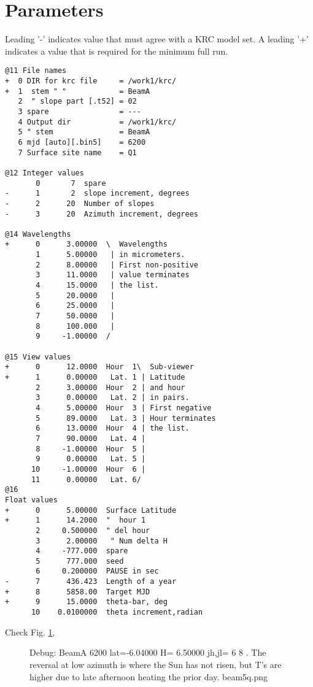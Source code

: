\documentclass{article}
\begin{document}
\section{Parameters}
Leading '-' indicates value that must agree with a KRC model set. A leading '+' indicates a value that is required for the minimum full run.
\vspace{-3.mm} 
\begin{verbatim}
@11 File names
+  0 DIR for krc file     = /work1/krc/
+  1  stem " "            = BeamA
   2  " slope part [.t52] = 02
   3 spare                = ---
   4 Output dir           = /work1/krc/
   5 " stem               = BeamA
   6 mjd [auto][.bin5]    = 6200
   7 Surface site name    = Q1

@12 Integer values
       0       7  spare
-      1       2  slope increment, degrees
-      2      20  Number of slopes
-      3      20  Azimuth increment, degrees

@14 Wavelengths
+      0      3.00000  \  Wavelengths
       1      5.00000   | in micrometers.
       2      8.00000   | First non-positive
       3      11.0000   | value terminates
       4      15.0000   | the list.
       5      20.0000   |
       6      25.0000   |
       7      50.0000   |
       8      100.000   |
       9     -1.00000  /

@15 View values
+      0      12.0000  Hour  1\  Sub-viewer
+      1      0.00000   Lat. 1 | Latitude
       2      3.00000  Hour  2 | and hour
       3      0.00000   Lat. 2 | in pairs.
       4      5.00000  Hour  3 | First negative
       5      89.0000   Lat. 3 | Hour terminates
       6      13.0000  Hour  4 | the list.
       7      90.0000   Lat. 4 | 
       8     -1.00000  Hour  5 | 
       9      0.00000   Lat. 5 | 
      10     -1.00000  Hour  6 | 
      11      0.00000   Lat. 6/
@16 
Float values
+      0      5.00000  Surface Latitude
+      1      14.2000  "  hour 1
       2     0.500000  " del hour
       3      2.00000   " Num delta H
       4     -777.000  spare
       5      777.000  seed
       6     0.200000  PAUSE in sec
-      7      436.423  Length of a year
+      8      5858.00  Target MJD
+      9      15.0000  theta-bar, deg
      10    0.0100000  theta increment,radian
\end{verbatim}  


Check Fig. \ref{beam5q}, 
\begin{figure}[!ht] 
\caption[Ts vrs azimuth]{Debug: BeamA 6200 lat=-6.04000 H= 6.50000 jh,jl= 6 8 .
  The reversal at low azimuth is where the Sun has not risen, but T's are higher
  due to late afternoon heating the prior day.
\label{beam5q}  beam5q.png }
\end{figure} 
\end{document}
